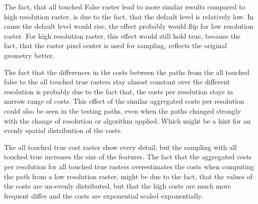 The fact, that all touched False raster lead to more similar results compared to high resolution raster, is due to the fact, that the default level is relatively low.
In cause the default level would rise, the effect probably would flip for low resolution raster.
For high resolution raster, this effect would still hold true, because the fact, that the raster pixel center is used for sampling, reflects the original geometry better.

The fact that the differences in the costs between the paths from the all touched false to the all touched true rasters stay almost constant over the different resolution is probably due to the fact that, the costs per resolution stays in narrow range of costs.
This effect of the similar aggregated costs per resolution could also be seen in the testing paths, even when the paths changed strongly with the change of resolution or algorithm applied.
Which might be a hint for an evenly spatial distribution of the costs.

The all touched true cost raster show every detail, but the sampling with all touched true increases the size of the features.
The fact that the aggregated costs per resolution for all touched true rasters overestimates the costs when computing the path from a low resolution raster, might be due to the fact, that the values of the costs are un-evenly distributed, but that the high costs are much more frequent differ and the costs are exponential scaled exponentially.

